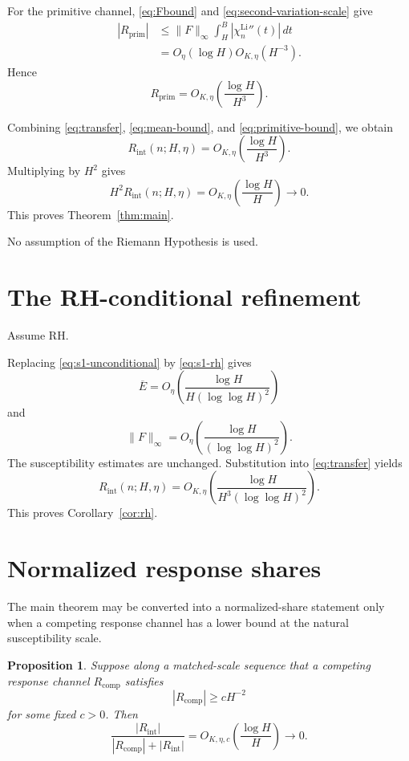 \documentclass[11pt]{article}
\newtheorem{proposition}[theorem]{Proposition}
\newcommand{\LiSus}{\chi^{\mathrm{Li}}}
\newcommand{\Rint}{R_{\mathrm{int}}}
\newcommand{\Ebar}{\overline E}
\begin{document}
For the primitive channel, \eqref{eq:Fbound} and
\eqref{eq:second-variation-scale} give
\[
\begin{aligned}
|R_{\mathrm{prim}}|
&\le
\|F\|_\infty
\int_H^B
|\LiSus_n''(t)|\,dt
\\
&=
O_\eta(\log H)
O_{K,\eta}(H^{-3}).
\end{aligned}
\]
Hence
\begin{equation}
\label{eq:primitive-bound}
R_{\mathrm{prim}}
=
O_{K,\eta}
\left(
\frac{\log H}{H^3}
\right).
\end{equation}

Combining \eqref{eq:transfer}, \eqref{eq:mean-bound}, and
\eqref{eq:primitive-bound}, we obtain
\[
\boxed{
\Rint(n;H,\eta)
=
O_{K,\eta}
\left(
\frac{\log H}{H^3}
\right).
}
\]
Multiplying by \(H^2\) gives
\[
H^2\Rint(n;H,\eta)
=
O_{K,\eta}
\left(
\frac{\log H}{H}
\right)
\to0.
\]
This proves Theorem~\ref{thm:main}.

No assumption of the Riemann Hypothesis is used.

\section{The RH-conditional refinement}

Assume RH.

Replacing \eqref{eq:s1-unconditional} by
\eqref{eq:s1-rh} gives
\[
\Ebar
=
O_\eta
\left(
\frac{\log H}
{H(\log\log H)^2}
\right)
\]
and
\[
\|F\|_\infty
=
O_\eta
\left(
\frac{\log H}
{(\log\log H)^2}
\right).
\]
The susceptibility estimates are unchanged. Substitution into
\eqref{eq:transfer} yields
\[
\boxed{
\Rint(n;H,\eta)
=
O_{K,\eta}
\left(
\frac{\log H}
{H^3(\log\log H)^2}
\right).
}
\]
This proves Corollary~\ref{cor:rh}.

\section{Normalized response shares}

The main theorem may be converted into a normalized-share statement
only when a competing response channel has a lower bound at the
natural susceptibility scale.

\begin{proposition}
\label{prop:abstract-share}
Suppose along a matched-scale sequence that a competing response
channel \(R_{\mathrm{comp}}\) satisfies
\[
|R_{\mathrm{comp}}|
\ge
cH^{-2}
\]
for some fixed \(c>0\). Then
\[
\frac{|\Rint|}
{
|R_{\mathrm{comp}}|+|\Rint|
}
=
O_{K,\eta,c}
\left(
\frac{\log H}{H}
\right)
\to0.
\]
\end{proposition}
\end{document}

